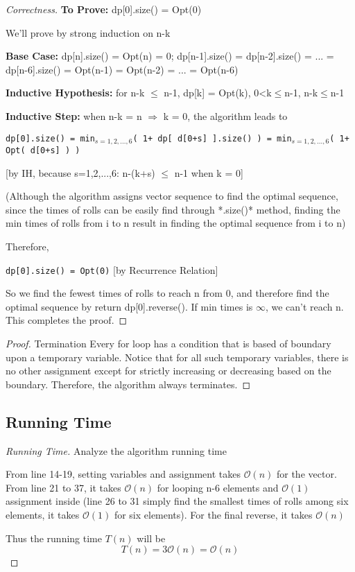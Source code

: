 \documentclass[openany]{article}
\begin{document}
\begin{proof}[Correctness]{}
    \textbf{To Prove:} dp[0].size() = Opt(0)
    
    We'll prove by strong induction on n-k
    
    \textbf{Base Case:} dp[n].size() = Opt(n) = 0; dp[n-1].size() = dp[n-2].size() = ... = dp[n-6].size() = Opt(n-1) = Opt(n-2) = ... = Opt(n-6)
    
    \textbf{Inductive Hypothesis:} for n-k $\leq$ n-1, dp[k] = Opt(k), 0<k$\leq$n-1, n-k$\leq$n-1
    
    \textbf{Inductive Step:} when n-k = n $\Rightarrow$ k = 0, the algorithm leads to
    \begin{center}
        \texttt{dp[0].size() = min$_{s=1,2,...,6}$( 1+ dp[ d[0+s] ].size() ) = min$_{s=1,2,...,6}$( 1+ Opt( d[0+s] ) )}
    \end{center}
    [by IH, because s=1,2,...,6: n-(k+s) $\leq$ n-1 when k = 0]

    (Although the algorithm assigns vector sequence to find the optimal sequence, since the times of rolls can be easily find through *.size()* method, finding the min times of rolls from i to n result in finding the optimal sequence from i to n)
    
    Therefore,
    \begin{center}
        \texttt{dp[0].size() = Opt(0)} [by Recurrence Relation]
    \end{center}
    
    So we find the fewest times of rolls to reach n from 0, and therefore find the optimal sequence by return dp[0].reverse(). If min times is $\infty$, we can't reach n. This completes the proof.

\end{proof}
\begin{proof}{Termination}
    Every for loop has a condition that is based of boundary upon a temporary variable. Notice that for all such temporary variables, there is no other assignment except for strictly increasing or decreasing based on the boundary. Therefore, the algorithm always terminates.
\end{proof}

\subsection*{Running Time}
\begin{proof}[Running Time]{Analyze the algorithm running time}
    	\renewcommand{\qedsymbol}{}
    	
    	From line 14-19, setting variables and assignment takes $\mathcal{O}(n)$ for the vector. From line 21 to 37, it takes $\mathcal{O}(n)$ for looping n-6 elements and $\mathcal{O}(1)$ assignment inside (line 26 to 31 simply find the smallest times of rolls among six elements, it takes $\mathcal{O}(1)$ for six elements). For the final reverse, it takes $\mathcal{O}(n)$
    	
    	Thus the running time $T(n)$ will be \[T(n)=3\mathcal{O}(n)=\mathcal{O}(n)\]
\end{proof}
\end{document}
